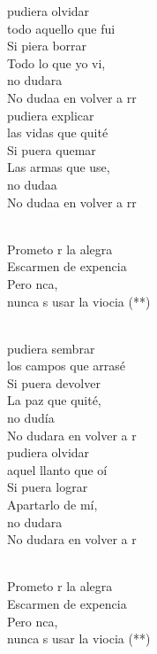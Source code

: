 \begin{cancion}%
	pudiera olvidar \\
todo aquello que fui\\
	Si piera borrar\\
Todo lo que yo vi, \\
	no dudara\\
	No dudaa en volver a rr \\
	pudiera explicar\\
las vidas que quité\\
	Si puera quemar\\
Las armas que use, \\
	no dudaa \\
	No dudaa en volver a rr \\\jump\\
	\begin{chorus}%
	Prometo r la alegra\\
	Escarmen de  expencia\\
	Pero nca,\\
	nunca s usar la viocia (**) \\
	\end{chorus}%
	\jump\\
	pudiera sembrar \\
los campos que arrasé\\
	Si puera devolver\\
La paz que quité, \\
	no dudía\\
	No dudara en volver a r \\
	pudiera olvidar \\
aquel llanto que oí\\
	Si puera lograr\\
Apartarlo de mí, \\
	no dudara\\
	No dudara en volver a r \\\jump\\
	\begin{chorus}%
	Prometo r la alegra\\
	Escarmen de  expencia\\
	Pero nca,\\
	nunca s usar la viocia (**) \\
	\end{chorus}%
	\jump\\
\end{cancion}%
